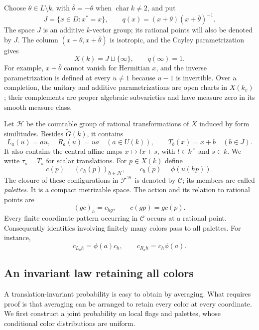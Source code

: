 Choose $\theta\in L\setminus k$, with $\bar\theta=-\theta$ when
$\operatorname{char}k\ne2$, and put
\[
 J=\{x\in D:x^*=x\},\qquad
 q(x)=(x+\theta)(x+\bar\theta)^{-1}.
\]
The space $J$ is an additive $k$-vector group; its rational points will
also be denoted by $J$.  The column $(x+\theta,x+\bar\theta)$ is isotropic,
and the Cayley parametrization gives
\begin{equation}\label{pal:cayley}
 X(k)=J\sqcup\{\infty\},\qquad q(\infty)=1.
\end{equation}
For example, $x+\bar\theta$ cannot vanish for Hermitian $x$, and the
inverse parametrization is defined at every $u\ne1$ because $u-1$ is
invertible.  Over a completion, the unitary and additive parametrizations
are open charts in $X(k_v)$; their complements are proper algebraic
subvarieties and have measure zero in its smooth measure class.

Let $\mathcal H$ be the countable group of rational transformations of
$X$ induced by form similitudes.  Besides $\widetilde G(k)$, it contains
\[
 L_a(u)=au,\quad R_a(u)=ua\quad(a\in U(k)),\qquad
 T_b(x)=x+b\quad(b\in J).
\]
It also contains the central affine maps $x\mapsto lx+s$, with
$l\in k^\times$ and $s\in k$.  We write $\tau_s=T_s$ for scalar
translations.  For $p\in X(k)$ define
\[
 c(p)=(c_h(p))_{h\in\mathcal H},\qquad
 c_h(p)=\phi(u(hp)).
\]
The closure of these configurations in $\mathcal F^{\mathcal H}$ is
denoted by $\mathcal C$; its members are called \emph{palettes}.  It is
a compact metrizable space.  The action and its relation to rational
points are
\[
 (g c)_h=c_{hg},\qquad c(gp)=g c(p).
\]
Every finite coordinate pattern occurring in $\mathcal C$ occurs at a
rational point.  Consequently identities involving finitely many colors
pass to all palettes.  For instance,
\begin{equation}\label{pal:rotation-rules}
 c_{L_a h}=\phi(a)c_h,\qquad
 c_{R_a h}=c_h\phi(a).
\end{equation}

\subsection{An invariant law retaining all colors}

A translation-invariant probability is easy to obtain by averaging.
What requires proof is that averaging can be arranged to retain every
color at every coordinate.  We first construct a joint probability on
local flags and palettes, whose conditional color distributions are
uniform.

